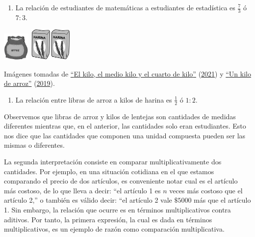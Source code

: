 \documentclass[
  11pt,
]{book}
\providecommand{\tightlist}{%
  \setlength{\itemsep}{0pt}\setlength{\parskip}{0pt}}
\begin{document}
\begin{enumerate}
\def\labelenumi{\arabic{enumi}.}
\setcounter{enumi}{1}
\tightlist
\item
  La relación de estudiantes de matemáticas a estudiantes de estadística es \(\frac{7}{3}\) ó \(7:3\).
\end{enumerate}

\includegraphics[width=0.52083in,height=\textheight]{ProtectoR/arroz.png} \includegraphics[width=0.41667in,height=\textheight]{ProtectoR/harina.png}\includegraphics[width=0.41667in,height=\textheight]{ProtectoR/harina.png}

Imágenes tomadas de \protect\hyperlink{ref-BibEntry2021Marzo}{{``{El kilo, el medio kilo y el cuarto de kilo}''}} (\protect\hyperlink{ref-BibEntry2021Marzo}{2021}) y \protect\hyperlink{ref-BibEntry2019Mar}{{``{Un kilo de arroz}''}} (\protect\hyperlink{ref-BibEntry2019Mar}{2019}).

\begin{enumerate}
\def\labelenumi{\arabic{enumi}.}
\setcounter{enumi}{2}
\tightlist
\item
  La relación entre libras de arroz a kilos de harina es \(\frac{1}{2}\) ó \(1:2\).
\end{enumerate}

Observemos que libras de arroz y kilos de lentejas son cantidades de medidas diferentes mientras que, en el anterior, las cantidades solo eran estudiantes. Esto nos dice que las cantidades que componen una unidad compuesta pueden ser las mismas o diferentes.

La segunda interpretación consiste en comparar multiplicativamente dos cantidades. Por ejemplo, en una situación cotidiana en el que estamos comparando el precio de dos artículos, es conveniente notar cual es el artículo más costoso, de lo que lleva a decir: ``el artículo 1 es \(n\) veces más costoso que el artículo 2,'' o también es válido decir: ``el artículo 2 vale \(\$5000\) más que el artículo 1. Sin embargo, la relación que ocurre es en términos multiplicativos contra aditivos. Por tanto, la primera expresión, la cual es dada en términos multiplicativos, es un ejemplo de razón como comparación multiplicativa.
\end{document}
